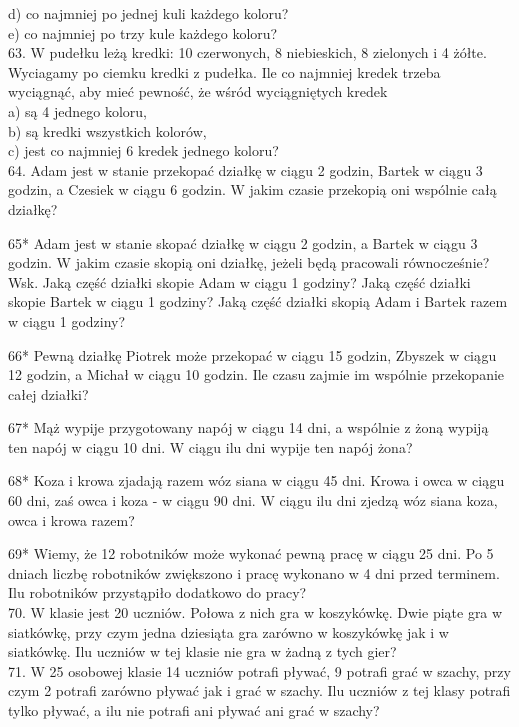 \documentclass[10pt]{article}
\begin{document}
d) co najmniej po jednej kuli każdego koloru?\\
e) co najmniej po trzy kule każdego koloru?\\
63. W pudełku leżą kredki: 10 czerwonych, 8 niebieskich, 8 zielonych i 4 żółte. Wyciagamy po ciemku kredki z pudełka. Ile co najmniej kredek trzeba wyciągnąć, aby mieć pewność, że wśród wyciągniętych kredek\\
a) są 4 jednego koloru,\\
b) są kredki wszystkich kolorów,\\
c) jest co najmniej 6 kredek jednego koloru?\\
64. Adam jest w stanie przekopać działkę w ciągu 2 godzin, Bartek w ciągu 3 godzin, a Czesiek w ciągu 6 godzin. W jakim czasie przekopią oni wspólnie całą działkę?

65* Adam jest w stanie skopać działkę w ciągu 2 godzin, a Bartek w ciągu 3 godzin. W jakim czasie skopią oni działkę, jeżeli będą pracowali równocześnie?\\
Wsk. Jaką część działki skopie Adam w ciągu 1 godziny? Jaką część działki skopie Bartek w ciągu 1 godziny? Jaką część działki skopią Adam i Bartek razem w ciągu 1 godziny?

66* Pewną działkę Piotrek może przekopać w ciągu 15 godzin, Zbyszek w ciągu 12 godzin, a Michał w ciągu 10 godzin. Ile czasu zajmie im wspólnie przekopanie całej działki?

67* Mąż wypije przygotowany napój w ciągu 14 dni, a wspólnie z żoną wypiją ten napój w ciągu 10 dni. W ciągu ilu dni wypije ten napój żona?

68* Koza i krowa zjadają razem wóz siana w ciągu 45 dni. Krowa i owca w ciągu 60 dni, zaś owca i koza - w ciągu 90 dni. W ciągu ilu dni zjedzą wóz siana koza, owca i krowa razem?

69* Wiemy, że 12 robotników może wykonać pewną pracę w ciągu 25 dni. Po 5 dniach liczbę robotników zwiększono i pracę wykonano w 4 dni przed terminem. Ilu robotników przystąpiło dodatkowo do pracy?\\
70. W klasie jest 20 uczniów. Połowa z nich gra w koszykówkę. Dwie piąte gra w siatkówkę, przy czym jedna dziesiąta gra zarówno w koszykówkę jak i w siatkówkę. Ilu uczniów w tej klasie nie gra w żadną z tych gier?\\
71. W 25 osobowej klasie 14 uczniów potrafi pływać, 9 potrafi grać w szachy, przy czym 2 potrafi zarówno pływać jak i grać w szachy. Ilu uczniów z tej klasy potrafi tylko pływać, a ilu nie potrafi ani pływać ani grać w szachy?
\end{document}
